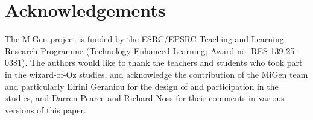 \documentclass[authoryear,preprint,12pt]{elsarticle}
\begin{document}











\section*{Acknowledgements} 

The MiGen project is funded by the ESRC/EPSRC Teaching and
Learning Research Programme (Technology Enhanced Learning; Award no:
RES-139-25-0381). The authors would
like to thank the teachers and students who took part in the
wizard-of-Oz studies, and acknowledge the contribution of the MiGen team and
particularly Eirini Geraniou for the design of and
 participation in the studies, and Darren Pearce and Richard Noss for their comments in various versions of this paper. 




\end{document}
